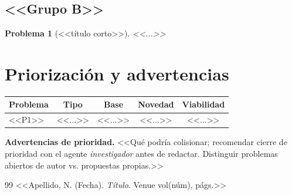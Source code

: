\documentclass[11pt]{article}
\newtheorem{problema}{Problema}
\begin{document}
\subsection*{<<Grupo B>>}
\begin{problema}[<<título corto>>]
<<...>>
\end{problema}

\section{Priorización y advertencias}
\begin{center}\small
\begin{tabular}{@{}p{5.6cm}cccc@{}}
\toprule
\textbf{Problema} & \textbf{Tipo} & \textbf{Base} & \textbf{Novedad} & \textbf{Viabilidad}\\
\midrule
<<P1>> & <<...>> & <<...>> & <<...>> & <<...>>\\
\bottomrule
\end{tabular}
\end{center}

\begin{caja}
\textbf{Advertencias de prioridad.} <<Qué podría colisionar; recomendar cierre de prioridad con el agente \emph{investigador} antes de redactar. Distinguir problemas abiertos de autor vs. propuestas propias.>>
\end{caja}

\begin{thebibliography}{99}\small
{} <<Apellido, N. (Fecha). \emph{Título}. Venue vol(núm), págs.>>
\end{thebibliography}
\end{document}
